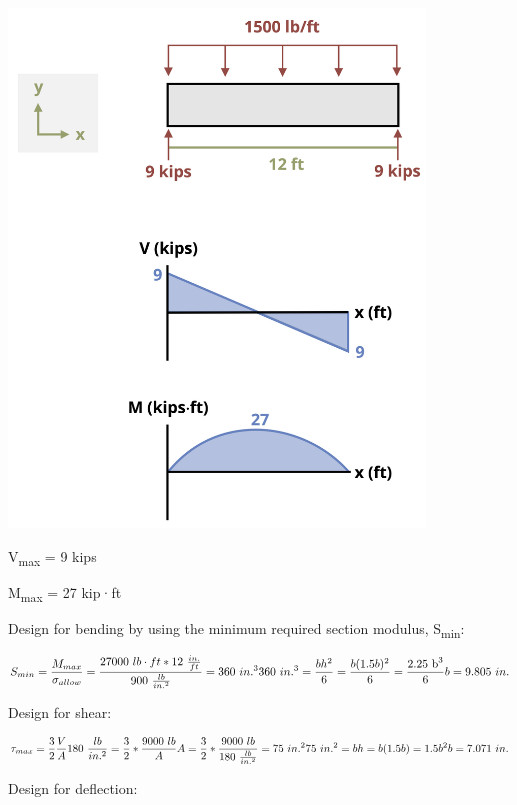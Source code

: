 \documentclass[
  letterpaper,
  DIV=11,
  numbers=noendperiod]{scrreprt}
\theoremstyle{definition}
\theoremstyle{remark}
\begin{document}
\begin{tcolorbox}
\begin{tcolorbox}
\begin{center}
\includegraphics[width=4.35417in,height=\textheight]{images/CH11 PNGs/example11.8-2.png}
\end{center}

V\textsubscript{max} = 9 kips

M\textsubscript{max} = 27 kip·ft

Design for bending by using the minimum required section modulus,
S\textsubscript{min}:

\[
S_{min}=\frac{M_{max}}{\sigma_{allow}}=\frac{27000{~lb}\cdot{ft}*12~\frac{in.}{ft}}{900~\frac{lb}{in.^2}}=360{~in.^3} \\
360{~in.^3}=\frac{b h^2}{6}=\frac{b(1.5b)^2}{6}=\frac{2.25 \mathrm{~b}^3}{6} \\ 
 b =9.805{~in.}
\]

Design for shear:

\[
\tau_{max}=\frac{3}{2} \frac{V}{A} \\
180~\frac{lb}{in.^2}=\frac{3}{2}*\frac{9000{~lb}}{A} \\
A=\frac{3}{2}*\frac{9000{~lb}}{180~\frac{lb}{in.^2}}=75{~in.^2} \\
75{~in.^2}=b h=b(1.5 b)=1.5 b^2 \\ 
b=7.071{~in.}
\]

Design for deflection:


\end{tcolorbox}
\end{tcolorbox}
\end{document}
